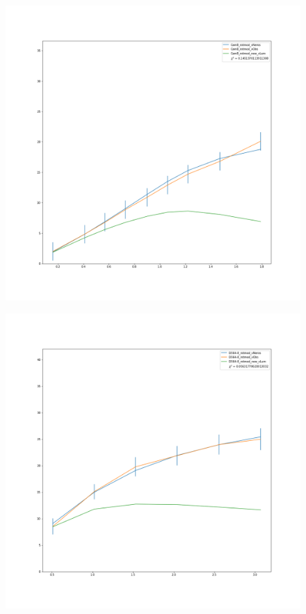 \documentclass[reprint,%
 amsmath,amssymb,
 aps,
]{revtex4-1}
\begin{document}
\begin{figure}
\centering
\begin{minipage}{.5\textwidth}
  \centering
  \includegraphics[width=.95\linewidth]{figures/CamB_rotmod_XueSofue.png}
  \label{fig:test1}
\end{minipage}%
\begin{minipage}{.5\textwidth}
  \centering
  \includegraphics[width=.95\linewidth]{figures/D564-8_rotmod_XueSofue.png}

\end{minipage}
\end{figure}
\end{document}
